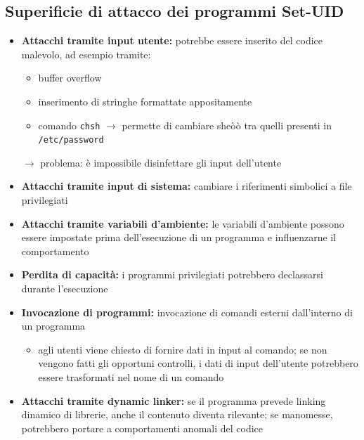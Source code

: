 \subsection{Superificie di attacco dei programmi Set-UID}
\begin{itemize}
    \item \textbf{Attacchi tramite input utente:} potrebbe essere inserito del codice malevolo, ad esempio
    tramite:
    \begin{itemize}
        \item buffer overflow
        \item inserimento di stringhe formattate appositamente 
        \item comando \texttt{chsh} $\rightarrow$ permette di cambiare sheòò tra quelli presenti 
        in \texttt{/etc/password}
    \end{itemize}

    $\rightarrow$ problema: è impossibile disinfettare gli input dell'utente
    \item \textbf{Attacchi tramite input di sistema:} cambiare i riferimenti simbolici a file 
    privilegiati
    \item \textbf{Attacchi tramite variabili d'ambiente:} le variabili d'ambiente possono 
    essere impostate prima dell'esecuzione di un programma e influenzarne il comportamento
    \item \textbf{Perdita di capacità:} i programmi privilegiati potrebbero declassarsi 
    durante l'esecuzione
    \item \textbf{Invocazione di programmi:} invocazione di comandi esterni dall'interno di un 
    programma
    \begin{itemize}
        \item agli utenti viene chiesto di fornire dati in input al comando; se non vengono fatti 
        gli opportuni controlli, i dati di input dell'utente potrebbero essere trasformati nel 
        nome di un comando
    \end{itemize}
    \item \textbf{Attacchi tramite dynamic linker:} se il programma prevede linking dinamico di 
    librerie, anche il contenuto diventa rilevante; se manomesse, potrebbero portare a comportamenti 
    anomali del codice
\end{itemize}